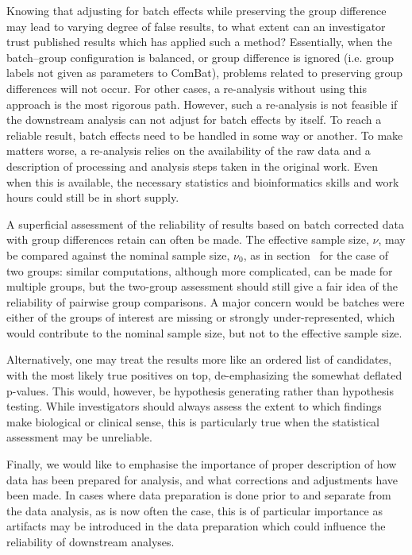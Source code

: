 \documentclass{bio}
\begin{document}
Knowing that adjusting for batch effects while preserving the group difference may lead to varying degree of false results, to what extent can an investigator trust published results which has applied such a method? Essentially, when the batch--group configuration is balanced, or group difference is ignored  (i.e. group labels not given as parameters to ComBat), problems related to preserving group differences will not occur. For other cases, a re-analysis without using this approach is the most rigorous path. However, such a re-analysis is not feasible if the downstream  analysis can not adjust for batch effects by itself. To reach a reliable result, batch effects need to be handled in some way or another. To make matters worse, a re-analysis relies on the availability of the raw data and a description of processing and analysis steps taken in the original work. Even when this is available, the necessary statistics and bioinformatics skills and work hours could still be in short supply.

A superficial assessment of the reliability of results based on batch corrected data with group differences retain can often be made. The effective sample size, $\nu$, may be compared against the nominal sample size, $\nu_0$, as in section~\label{sec:twogroups} for the case of two groups: similar computations, although more complicated, can be made for multiple groups, but the two-group assessment should still give a fair idea of the reliability of pairwise group comparisons. A major concern would be batches were either of the groups of interest are missing or strongly under-represented, which would contribute to the nominal sample size, but not to the effective sample size.

Alternatively, one may treat the results more like an ordered list of candidates, with the most likely true positives on top, de-emphasizing the somewhat deflated p-values. This would, however, be hypothesis generating rather than hypothesis testing. While investigators should always assess the extent to which findings make biological or clinical sense, this is particularly true when the statistical assessment may be unreliable.

Finally, we would like to emphasise the importance of proper description of how data has been prepared for analysis, and what corrections and adjustments have been made. In cases where data preparation is done prior to and separate from the data analysis, as is now often the case, this is of particular importance as artifacts may be introduced in the data preparation which could influence the reliability of downstream analyses.
\end{document}
